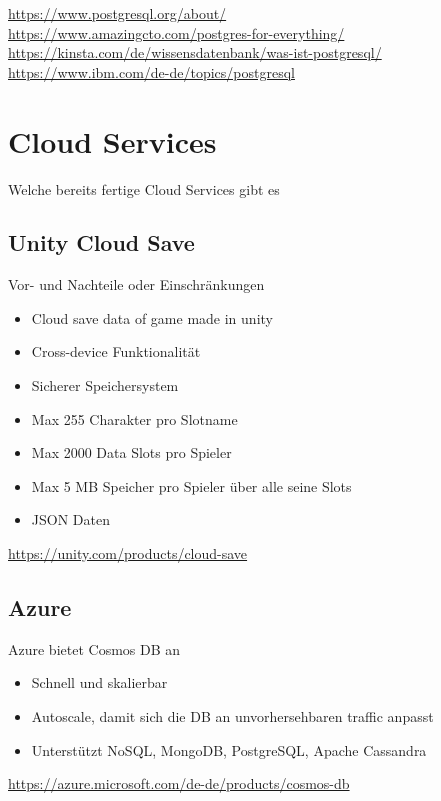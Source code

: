 \url{https://www.postgresql.org/about/}\\
\url{https://www.amazingcto.com/postgres-for-everything/}\\
\url{https://kinsta.com/de/wissensdatenbank/was-ist-postgresql/}\\
\url{https://www.ibm.com/de-de/topics/postgresql}

\section{Cloud Services}
Welche bereits fertige Cloud Services gibt es

\subsection{Unity Cloud Save} 
Vor- und Nachteile oder Einschränkungen\\

\begin{itemize}
    \item Cloud save data of game made in unity
    \item Cross-device Funktionalität
    \item Sicherer Speichersystem
    \item Max 255 Charakter pro Slotname
    \item Max 2000 Data Slots pro Spieler
    \item Max 5 MB Speicher pro Spieler über alle seine Slots
    \item JSON Daten
\end{itemize}

\url{https://unity.com/products/cloud-save}

\subsection{Azure}
Azure bietet Cosmos DB an \\
\begin{itemize}
    \item Schnell und skalierbar
    \item Autoscale, damit sich die DB an unvorhersehbaren traffic anpasst
    \item Unterstützt NoSQL, MongoDB, PostgreSQL, Apache Cassandra
\end{itemize}
\url{https://azure.microsoft.com/de-de/products/cosmos-db}

